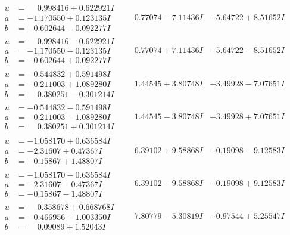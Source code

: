 \documentclass[1p]{elsarticle_modified}
\theoremstyle{definition}
\begin{document}
$$\begin{array}{c|c|c}
\begin{aligned}
u &= \phantom{-}0.998416 + 0.622921 I \\
a &= -1.170550 + 0.123135 I \\
b &= -0.602644 - 0.092277 I\end{aligned}
 & \phantom{-}0.77074 - 7.11436 I & -5.64722 + 8.51652 I \\ \hline\begin{aligned}
u &= \phantom{-}0.998416 - 0.622921 I \\
a &= -1.170550 - 0.123135 I \\
b &= -0.602644 + 0.092277 I\end{aligned}
 & \phantom{-}0.77074 + 7.11436 I & -5.64722 - 8.51652 I \\ \hline\begin{aligned}
u &= -0.544832 + 0.591498 I \\
a &= -0.211003 + 1.089280 I \\
b &= \phantom{-}0.380251 - 0.301214 I\end{aligned}
 & \phantom{-}1.44545 + 3.80748 I & -3.49928 - 7.07651 I \\ \hline\begin{aligned}
u &= -0.544832 - 0.591498 I \\
a &= -0.211003 - 1.089280 I \\
b &= \phantom{-}0.380251 + 0.301214 I\end{aligned}
 & \phantom{-}1.44545 - 3.80748 I & -3.49928 + 7.07651 I \\ \hline\begin{aligned}
u &= -1.058170 + 0.636584 I \\
a &= -2.31607 + 0.47367 I \\
b &= -0.15867 + 1.48807 I\end{aligned}
 & \phantom{-}6.39102 + 9.58868 I & -0.19098 - 9.12583 I \\ \hline\begin{aligned}
u &= -1.058170 - 0.636584 I \\
a &= -2.31607 - 0.47367 I \\
b &= -0.15867 - 1.48807 I\end{aligned}
 & \phantom{-}6.39102 - 9.58868 I & -0.19098 + 9.12583 I \\ \hline\begin{aligned}
u &= \phantom{-}0.358678 + 0.668768 I \\
a &= -0.466956 - 1.003350 I \\
b &= \phantom{-}0.09089 + 1.52043 I\end{aligned}
 & \phantom{-}7.80779 - 5.30819 I & -0.97544 + 5.25547 I \\ \hline\begin{aligned}

\end{aligned}
\end{array}$$
\end{document}
